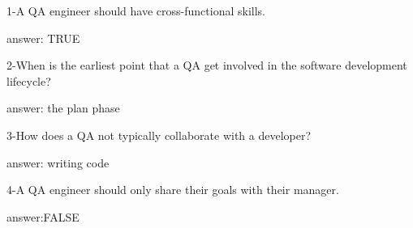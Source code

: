 1-A QA engineer should have cross-functional skills.


answer: TRUE

2-When is the earliest point that a QA get involved in the software development lifecycle?


answer: the plan phase

3-How does a QA not typically collaborate with a developer?


answer: writing code

4-A QA engineer should only share their goals with their manager.


answer:FALSE
